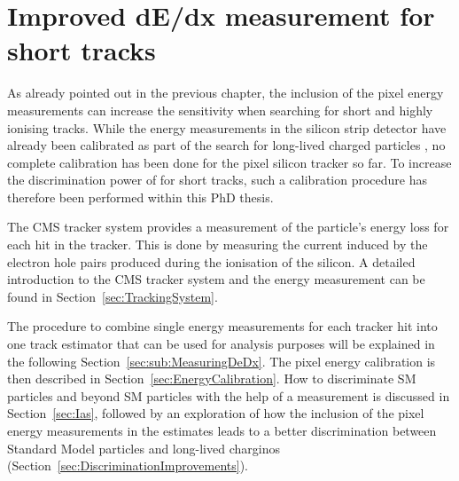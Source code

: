 \FloatBarrier
\chapter{Improved dE/dx measurement for short tracks}
\label{sec:DeDxMeasurement}
As already pointed out in the previous chapter, the inclusion of the pixel energy measurements can increase the sensitivity when searching for short and highly ionising tracks.
While the energy measurements in the silicon strip detector have already been calibrated as part of the search for long-lived charged particles \cite{bib:CMS:HSCP_8TeV}, no complete calibration has been done for the pixel silicon tracker so far.
To increase the discrimination power of \dedx for short tracks, such a calibration procedure has therefore been performed within this PhD thesis.

The CMS tracker system provides a measurement of the particle's energy loss for each hit in the tracker.
This is done by measuring the current induced by the electron hole pairs produced during the ionisation of the silicon.
A detailed introduction to the CMS tracker system and the energy measurement can be found in Section~\ref{sec:TrackingSystem}.

The procedure to combine single energy measurements for each tracker hit into one track \dedx estimator that can be used for analysis purposes will be explained in the following Section~\ref{sec:sub:MeasuringDeDx}.
The pixel energy calibration is then described in Section~\ref{sec:EnergyCalibration}. 
How to discriminate SM particles and beyond SM particles with the help of a \dedx measurement is discussed in Section~\ref{sec:Ias}, followed by an exploration of how the inclusion of the pixel energy measurements in the \dedx estimates leads to a better discrimination between Standard Model particles and long-lived charginos (Section~\ref{sec:DiscriminationImprovements}).


